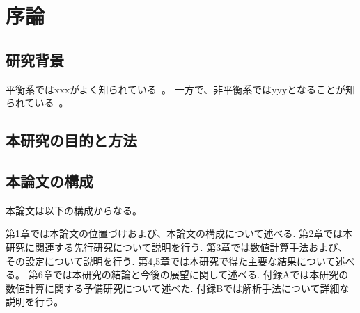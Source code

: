 \documentclass[thesis]{subfiles}
\begin{document}
\chapter{序論}

\section{研究背景}
平衡系ではxxxがよく知られている~\cite{zwanzig2001nonequilibrium}。
一方で、非平衡系ではyyyとなることが知られている~\cite{Widder1989,Stolovitzky1998}。
\section{本研究の目的と方法}

\section{本論文の構成}
本論文は以下の構成からなる。

第1章では本論文の位置づけおよび、本論文の構成について述べる.
第2章では本研究に関連する先行研究について説明を行う.
第3章では数値計算手法および、その設定について説明を行う.
第4,5章では本研究で得た主要な結果について述べる。
第6章では本研究の結論と今後の展望に関して述べる.
付録Aでは本研究の数値計算に関する予備研究について述べた.
付録Bでは解析手法について詳細な説明を行う。
\end{document}
